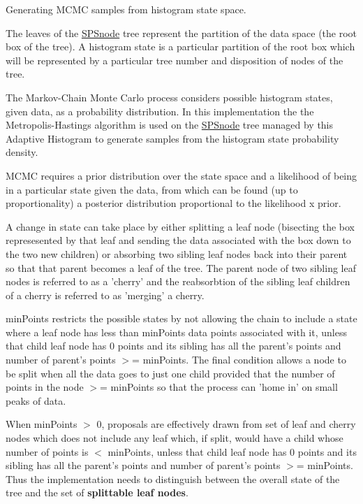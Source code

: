 \-Generating \-M\-C\-M\-C samples from histogram state space. 

\-The leaves of the \hyperlink{classsubpavings_1_1SPSnode}{\-S\-P\-Snode} tree represent the partition of the data space (the root box of the tree). \-A histogram state is a particular partition of the root box which will be represented by a particular tree number and disposition of nodes of the tree.

\-The \-Markov-\/\-Chain \-Monte \-Carlo process considers possible histogram states, given data, as a probability distribution. \-In this implementation the the \-Metropolis-\/\-Hastings algorithm is used on the \hyperlink{classsubpavings_1_1SPSnode}{\-S\-P\-Snode} tree managed by this \-Adaptive \-Histogram to generate samples from the histogram state probability density.

\-M\-C\-M\-C requires a prior distribution over the state space and a likelihood of being in a particular state given the data, from which can be found (up to proportionality) a posterior distribution proportional to the likelihood x prior.

\-A change in state can take place by either splitting a leaf node (bisecting the box represesented by that leaf and sending the data associated with the box down to the two new children) or absorbing two sibling leaf nodes back into their parent so that that parent becomes a leaf of the tree. \-The parent node of two sibling leaf nodes is referred to as a 'cherry' and the reabsorbtion of the sibling leaf children of a cherry is referred to as 'merging' a cherry.

min\-Points restricts the possible states by not allowing the chain to include a state where a leaf node has less than min\-Points data points associated with it, unless that child leaf node has 0 points and its sibling has all the parent's points and number of parent's points $>$= min\-Points. \-The final condition allows a node to be split when all the data goes to just one child provided that the number of points in the node $>$= min\-Points so that the process can 'home in' on small peaks of data.

\-When min\-Points $>$ 0, proposals are effectively drawn from set of leaf and cherry nodes which does not include any leaf which, if split, would have a child whose number of points is $<$ min\-Points, unless that child leaf node has 0 points and its sibling has all the parent's points and number of parent's points $>$= min\-Points. \-Thus the implementation needs to distinguish between the overall state of the tree and the set of {\bfseries splittable leaf nodes}.

